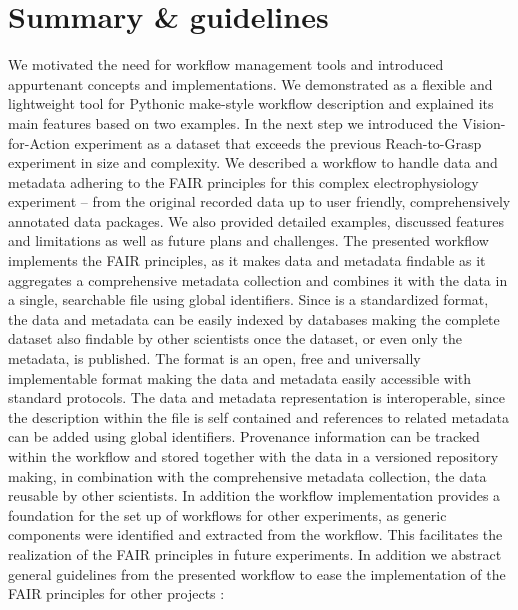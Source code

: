 \section{Summary \& guidelines}
\label{sec:guidelines}
We motivated the need for workflow management tools and introduced appurtenant concepts and implementations. We demonstrated  as a flexible and lightweight tool for Pythonic make-style workflow description and explained its main features based on two examples. In the next step we introduced the Vision-for-Action experiment as a dataset that exceeds the previous Reach-to-Grasp experiment in size and complexity. We described a workflow to handle data and metadata adhering to the FAIR principles for this complex electrophysiology experiment -- from the original recorded data up to user friendly, comprehensively annotated data packages. We also provided detailed examples, discussed features and limitations as well as future plans and challenges.
The presented workflow implements the FAIR principles, as it makes data and metadata findable as it aggregates a comprehensive metadata collection and combines it with the data in a single, searchable  file using global identifiers. Since   is a standardized format, the data and metadata can be easily indexed by databases making the complete dataset also findable by other scientists once the dataset, or even only the metadata, is published.
The  format is an open, free and universally implementable format making the data and metadata easily accessible with standard protocols. The data and metadata representation is interoperable, since the description within the  file is self contained and references to related metadata can be added using global identifiers.
Provenance information can be tracked within the workflow and stored together with the data in a versioned repository making, in combination with the comprehensive metadata collection, the data reusable by other scientists.
In addition the workflow implementation provides a foundation for the set up of workflows for other experiments, as generic components were identified and extracted from the workflow. This facilitates the realization of the FAIR principles in future experiments. In addition we abstract general guidelines from the presented workflow to ease the implementation of the FAIR principles for other projects :

